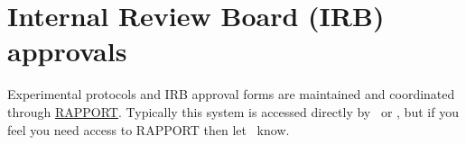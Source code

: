 \documentclass{tufte-book} %
\begin{document}






\chapter{Internal Review Board (IRB) approvals}\label{ch:irb}
Experimental  protocols and IRB approval forms are maintained and
coordinated through
\href{https://rapport.dartmouth.edu/}{RAPPORT}.  Typically this system
is accessed directly by \director~or \coordinator, but if you feel you
need access to RAPPORT then let \director~know.

\end{document}
